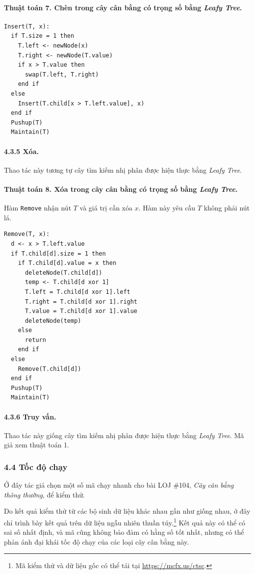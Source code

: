 \documentclass[11pt]{article}
\begin{document}
\paragraph{Thuật toán 7. Chèn trong cây cân bằng có trọng số bằng \emph{Leafy Tree}.}
\begin{verbatim}
Insert(T, x):
  if T.size = 1 then
    T.left <- newNode(x)
    T.right <- newNode(T.value)
    if x > T.value then
      swap(T.left, T.right)
    end if
  else
    Insert(T.child[x > T.left.value], x)
  end if
  Pushup(T)
  Maintain(T)
\end{verbatim}

\paragraph{4.3.5 Xóa.}
Thao tác này tương tự cây tìm kiếm nhị phân được hiện thực bằng
\emph{Leafy Tree}.

\paragraph{Thuật toán 8. Xóa trong cây cân bằng có trọng số bằng \emph{Leafy Tree}.}
Hàm \texttt{Remove} nhận nút \(T\) và giá trị cần xóa \(x\). Hàm này yêu cầu
\(T\) không phải nút lá.
\begin{verbatim}
Remove(T, x):
  d <- x > T.left.value
  if T.child[d].size = 1 then
    if T.child[d].value = x then
      deleteNode(T.child[d])
      temp <- T.child[d xor 1]
      T.left = T.child[d xor 1].left
      T.right = T.child[d xor 1].right
      T.value = T.child[d xor 1].value
      deleteNode(temp)
    else
      return
    end if
  else
    Remove(T.child[d])
  end if
  Pushup(T)
  Maintain(T)
\end{verbatim}

\paragraph{4.3.6 Truy vấn.}
Thao tác này giống cây tìm kiếm nhị phân được hiện thực bằng \emph{Leafy Tree}.
Mã giả xem thuật toán 1.

\subsubsection*{4.4 Tốc độ chạy}

Ở đây tác giả chọn một số mã chạy nhanh cho bài LOJ \#104, \emph{Cây cân bằng
thông thường}, để kiểm thử.

Do kết quả kiểm thử từ các bộ sinh dữ liệu khác nhau gần như giống nhau, ở đây
chỉ trình bày kết quả trên dữ liệu ngẫu nhiên thuần túy.\footnote{Mã kiểm thử
và dữ liệu gốc có thể tải tại \url{https://mcfx.us/ctsc}.} Kết quả này có thể
có sai số nhất định, và mã cũng không bảo đảm có hằng số tốt nhất, nhưng có thể
phản ánh đại khái tốc độ chạy của các loại cây cân bằng này.
\end{document}
